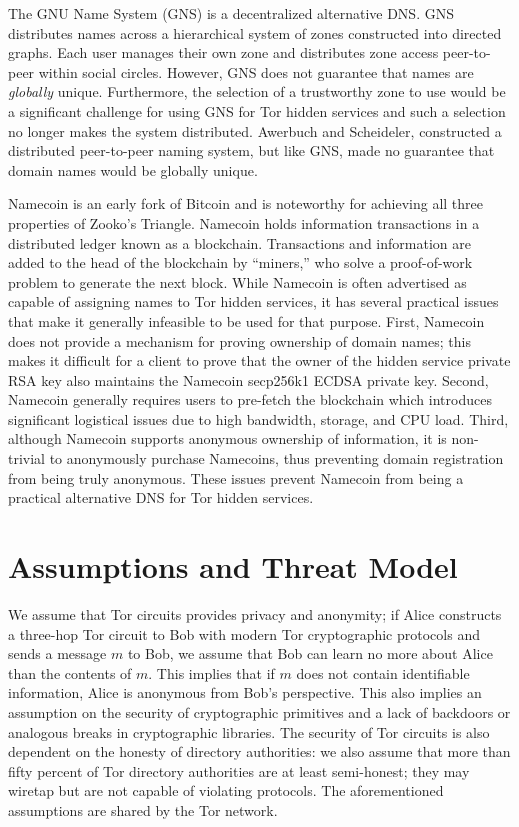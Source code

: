 \documentclass[USenglish,oneside,twocolumn]{article}
\begin{document}
The GNU Name System \cite{wachs2014censorship} (GNS) is a decentralized alternative DNS. GNS distributes names across a hierarchical system of zones constructed into directed graphs. Each user manages their own zone and distributes zone access peer-to-peer within social circles. However, GNS does not guarantee that names are \emph{globally} unique. Furthermore, the selection of a trustworthy zone to use would be a significant challenge for using GNS for Tor hidden services and such a selection no longer makes the system distributed. Awerbuch and Scheideler, \cite{awerbuch2004group} constructed a distributed peer-to-peer naming system, but like GNS, made no guarantee that domain names would be globally unique.

Namecoin \cite{NamecoinHome} is an early fork of Bitcoin \cite{nakamoto2008bitcoin} and is noteworthy for achieving all three properties of Zooko's Triangle. Namecoin holds information transactions in a distributed ledger known as a blockchain. Transactions and information are added to the head of the blockchain by ``miners,'' who solve a proof-of-work problem to generate the next block. While Namecoin is often advertised as capable of assigning names to Tor hidden services, it has several practical issues that make it generally infeasible to be used for that purpose. First, Namecoin does not provide a mechanism for proving ownership of domain names; this makes it difficult for a client to prove that the owner of the hidden service private RSA key also maintains the Namecoin secp256k1 ECDSA private key. Second, Namecoin generally requires users to pre-fetch the blockchain which introduces significant logistical issues due to high bandwidth, storage, and CPU load. Third, although Namecoin supports anonymous ownership of information, it is non-trivial to anonymously purchase Namecoins, thus preventing domain registration from being truly anonymous. These issues prevent Namecoin from being a practical alternative DNS for Tor hidden services.


\section{Assumptions and Threat Model}
\label{sec:threatModel}

We assume that Tor circuits provides privacy and anonymity; if Alice constructs a three-hop Tor circuit to Bob with modern Tor cryptographic protocols and sends a message $ m $ to Bob, we assume that Bob can learn no more about Alice than the contents of $ m $. This implies that if $ m $ does not contain identifiable information, Alice is anonymous from Bob's perspective. This also implies an assumption on the security of cryptographic primitives and a lack of backdoors or analogous breaks in cryptographic libraries. The security of Tor circuits is also dependent on the honesty of directory authorities: we also assume that more than fifty percent of Tor directory authorities are at least semi-honest; they may wiretap but are not capable of violating protocols. The aforementioned assumptions are shared by the Tor network.
\end{document}
